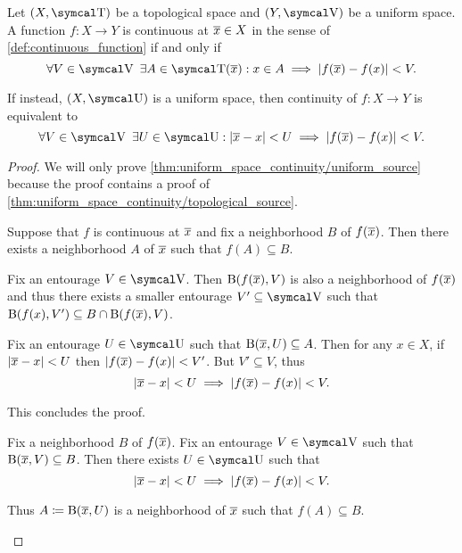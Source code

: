 \begin{proposition}\label{thm:uniform_space_continuity}
  Let \( (X, \T) \) be a topological space and \( (Y, \V) \) be a uniform space. A function \( f: X \to Y \) is continuous at \( \overline{x} \in X \) in the sense of \cref{def:continuous_function} if and only if
  \begin{equation}\label{thm:uniform_space_continuity/topological_source}
    \forall V \in \V \ \exists A \in \T(\Ol x) : x \in A \implies \Abs{f(\Ol{x}) - f(x)} < V.
  \end{equation}

  If instead, \( (X, \U) \) is a uniform space, then continuity of \( f: X \to Y \) is equivalent to
  \begin{equation}\label{thm:uniform_space_continuity/uniform_source}
    \forall V \in \V \ \exists U \in \U : \Abs{\Ol{x} - x} < U \implies \Abs{f(\Ol{x}) - f(x)} < V.
  \end{equation}
\end{proposition}
\begin{proof}
  We will only prove \cref{thm:uniform_space_continuity/uniform_source} because the proof contains a proof of \cref{thm:uniform_space_continuity/topological_source}.

  \begin{description}
    \Implies Suppose that \( f \) is continuous at \( \overline{x} \) and fix a neighborhood \( B \) of \( f(\overline{x}) \). Then there exists a neighborhood \( A \) of \( \overline{x} \) such that \( f(A) \subseteq B \).

    Fix an entourage \( V \in \V \). Then \( \operatorname{B}(f(\overline{x}), V) \) is also a neighborhood of \( f(\overline{x}) \) and thus there exists a smaller entourage \( V' \subseteq \V \) such that \( \operatorname{B}(f(x), V') \subseteq B \cap \operatorname{B}(f(\overline{x}), V) \).

    Fix an entourage \( U \in \U \) such that \( \operatorname{B}(\overline{x}, U) \subseteq A \). Then for any \( x \in X \), if \( \left\vert \overline{x} - x \right\vert < U \) then \( \left\vert f(\overline{x}) - f(x) \right\vert < V' \). But \( V' \subseteq V \), thus
    \begin{equation*}
      \left\vert \overline{x} - x \right\vert < U \implies \left\vert f(\overline{x}) - f(x) \right\vert < V.
    \end{equation*}

    This concludes the proof.

    \ImpliedBy Fix a neighborhood \( B \) of \( f(\overline{x}) \). Fix an entourage \( V \in \V \) such that \( \operatorname{B}(\overline{x}, V) \subseteq B \). Then there exists \( U \in \U \) such that
    \begin{equation*}
      \left\vert \overline{x} - x \right\vert < U \implies \left\vert f(\overline{x}) - f(x) \right\vert < V.
    \end{equation*}

    Thus \( A \coloneqq \operatorname{B}(\overline{x}, U) \) is a neighborhood of \( \overline{x} \) such that \( f(A) \subseteq B \).
  \end{description}
\end{proof}

